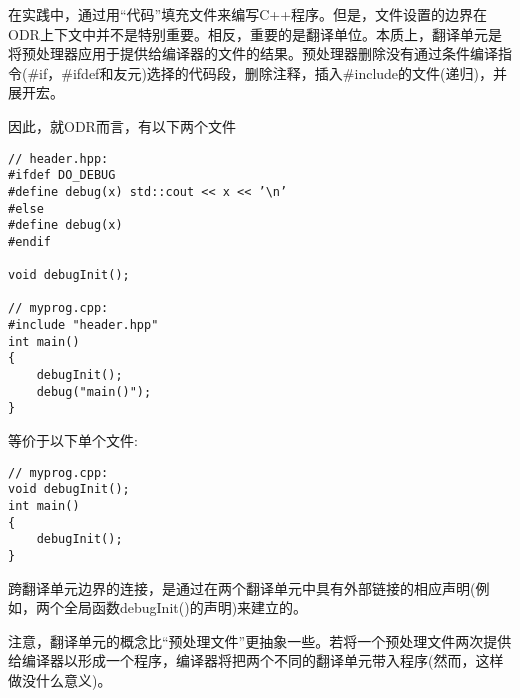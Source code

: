 在实践中，通过用“代码”填充文件来编写C++程序。但是，文件设置的边界在ODR上下文中并不是特别重要。相反，重要的是翻译单位。本质上，翻译单元是将预处理器应用于提供给编译器的文件的结果。预处理器删除没有通过条件编译指令(\#if，\#ifdef和友元)选择的代码段，删除注释，插入\#include的文件(递归)，并展开宏。

因此，就ODR而言，有以下两个文件

\begin{lstlisting}[style=styleCXX]
// header.hpp:
#ifdef DO_DEBUG
#define debug(x) std::cout << x << ’\n’
#else
#define debug(x)
#endif

void debugInit();

// myprog.cpp:
#include "header.hpp"
int main()
{
	debugInit();
	debug("main()");
}
\end{lstlisting}

等价于以下单个文件:

\begin{lstlisting}[style=styleCXX]
// myprog.cpp:
void debugInit();
int main()
{
	debugInit();
}
\end{lstlisting}

跨翻译单元边界的连接，是通过在两个翻译单元中具有外部链接的相应声明(例如，两个全局函数debugInit()的声明)来建立的。

注意，翻译单元的概念比“预处理文件”更抽象一些。若将一个预处理文件两次提供给编译器以形成一个程序，编译器将把两个不同的翻译单元带入程序(然而，这样做没什么意义)。









































